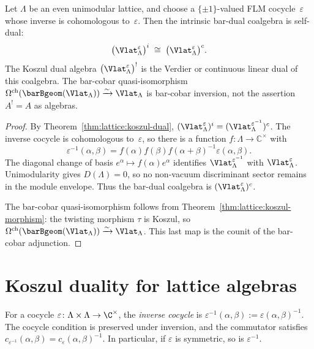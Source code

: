 \begin{theorem}\label{thm:lattice:unimodular-self-dual}
Let $\Lambda$ be an even unimodular lattice, and choose a
$\{\pm1\}$-valued FLM cocycle~$\varepsilon$ whose inverse is
cohomologous to~$\varepsilon$. Then the intrinsic bar-dual coalgebra is
self-dual:
\[
\bigl(\Vlat_\Lambda^\varepsilon\bigr)^i
\;\cong\; \bigl(\Vlat_\Lambda^\varepsilon\bigr)^c.
\]
The Koszul dual algebra
$\bigl(\Vlat_\Lambda^\varepsilon\bigr)^!$ is the Verdier or continuous
linear dual of this coalgebra. The bar-cobar quasi-isomorphism
$\Omega^{\mathrm{ch}}(\barBgeom(\Vlat_\Lambda)) \xrightarrow{\sim}
\Vlat_\Lambda$ is bar-cobar inversion, not the assertion
$A^!=A$ as algebras.
\end{theorem}

\begin{proof}
By Theorem~\ref{thm:lattice:koszul-dual},
$(\Vlat_\Lambda^\varepsilon)^i =
(\Vlat_\Lambda^{\varepsilon^{-1}})^c$. The inverse cocycle is
cohomologous to~$\varepsilon$, so there is a function
$f\colon\Lambda\to\mathbb C^\times$ with
\[
\varepsilon^{-1}(\alpha,\beta)
=
f(\alpha)f(\beta)f(\alpha+\beta)^{-1}\varepsilon(\alpha,\beta).
\]
The diagonal change of basis $e^\alpha\mapsto f(\alpha)e^\alpha$
identifies $\Vlat_\Lambda^{\varepsilon^{-1}}$ with
$\Vlat_\Lambda^\varepsilon$. Unimodularity gives
$D(\Lambda)=0$, so no non-vacuum discriminant sector remains in the
module envelope. Thus the bar-dual coalgebra is
$(\Vlat_\Lambda^\varepsilon)^c$.

The bar-cobar quasi-isomorphism follows from
Theorem~\ref{thm:lattice:koszul-morphism}: the twisting morphism
$\tau$ is Koszul, so
$\Omega^{\mathrm{ch}}(\barBgeom(\Vlat_\Lambda)) \xrightarrow{\sim}
\Vlat_\Lambda$. This last map is the counit of the bar-cobar
adjunction.
\end{proof}



\section{Koszul duality for lattice algebras}
\label{sec:lattice:koszul}

\begin{definition}\label{def:lattice:inverse-cocycle}
For a cocycle $\varepsilon \colon \Lambda \times \Lambda \to \C^\times$,
the \emph{inverse cocycle} is
$\varepsilon^{-1}(\alpha,\beta) := \varepsilon(\alpha,\beta)^{-1}$.
The cocycle condition is preserved under inversion, and the commutator
satisfies
$c_{\varepsilon^{-1}}(\alpha,\beta) = c_\varepsilon(\alpha,\beta)^{-1}$.
In particular, if $\varepsilon$ is symmetric, so is $\varepsilon^{-1}$.
\end{definition}

